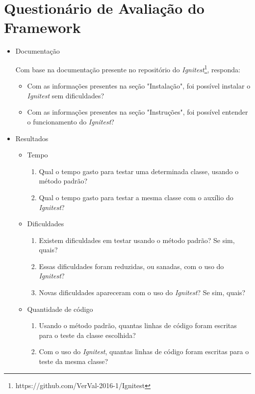 \chapter{Questionário de Avaliação do Framework}
\label{questionario}

  
    \begin{itemize}
        \item Documentação
        
            Com base na documentação presente no repositório do \textit{Ignitest}\footnote{https://github.com/VerVal-2016-1/Ignitest}, responda:
            \begin{itemize}
                \item Com as informações presentes na seção "Instalação", foi possível instalar o \textit{Ignitest} sem dificuldades?
                \item Com as informações presentes na seção "Instruções", foi possível entender o funcionamento do \textit{Ignitest}?
            \end{itemize}
            
        \item Resultados
            \begin{itemize}
                \item Tempo
                    \begin{enumerate}
                        \item Qual o tempo gasto para testar uma determinada classe, usando o método padrão?
                        \item Qual o tempo gasto para testar a mesma classe com o auxílio do \textit{Ignitest}?
                    \end{enumerate}
                \item Dificuldades
                    \begin{enumerate}
                        \item Existem dificuldades em testar usando o método padrão? Se sim, quais?
                        \item Essas dificuldades foram reduzidas, ou sanadas, com o uso do \textit{Ignitest}?
                        \item Novas dificuldades apareceram com o uso do \textit{Ignitest}? Se sim, quais?
                    \end{enumerate}
                \item Quantidade de código
                    \begin{enumerate}
                        \item Usando o método padrão, quantas linhas de código foram escritas para o teste da classe escolhida?
                        \item Com o uso do \textit{Ignitest}, quantas linhas de código foram escritas para o teste da mesma classe?
                    \end{enumerate}


\end{itemize}
\end{itemize}
